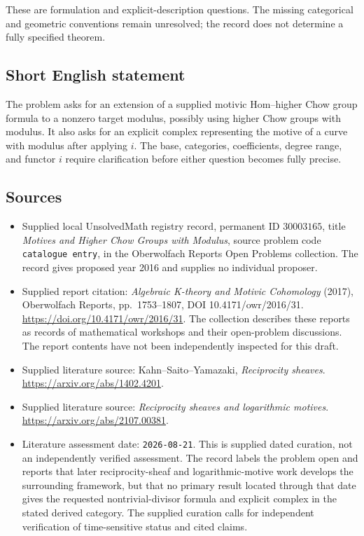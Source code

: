 \documentclass[11pt]{article}
\begin{document}
These are formulation and explicit-description questions. The missing categorical and geometric conventions remain unresolved; the record does not determine a fully specified theorem.
\subsection{Short English statement}
The problem asks for an extension of a supplied motivic Hom--higher Chow group formula to a nonzero target modulus, possibly using higher Chow groups with modulus. It also asks for an explicit complex representing the motive of a curve with modulus after applying \(i\). The base, categories, coefficients, degree range, and functor \(i\) require clarification before either question becomes fully precise.
\subsection{Sources}
\begin{itemize}
\item Supplied local UnsolvedMath registry record, permanent ID \(30003165\), title \emph{Motives and Higher Chow Groups with Modulus}, source problem code \texttt{catalogue entry}, in the Oberwolfach Reports Open Problems collection. The record gives proposed year 2016 and supplies no individual proposer.
\item Supplied report citation: \emph{Algebraic K-theory and Motivic Cohomology} (2017), Oberwolfach Reports, pp.\ 1753--1807, DOI 10.4171/owr/2016/31. \url{https://doi.org/10.4171/owr/2016/31}. The collection describes these reports as records of mathematical workshops and their open-problem discussions. The report contents have not been independently inspected for this draft.
\item Supplied literature source: Kahn--Saito--Yamazaki, \emph{Reciprocity sheaves}. \url{https://arxiv.org/abs/1402.4201}.
\item Supplied literature source: \emph{Reciprocity sheaves and logarithmic motives}. \url{https://arxiv.org/abs/2107.00381}.
\item Literature assessment date: \texttt{2026-08-21}. This is supplied dated curation, not an independently verified assessment. The record labels the problem open and reports that later reciprocity-sheaf and logarithmic-motive work develops the surrounding framework, but that no primary result located through that date gives the requested nontrivial-divisor formula and explicit complex in the stated derived category. The supplied curation calls for independent verification of time-sensitive status and cited claims.
\end{itemize}
\end{document}
